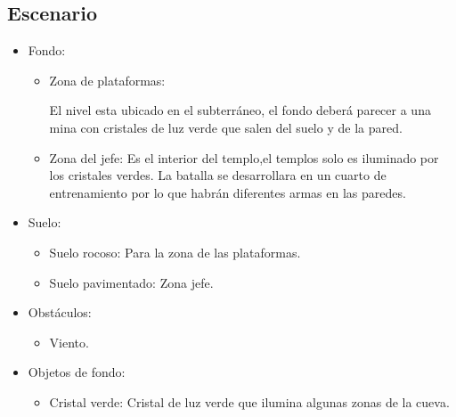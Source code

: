 \begin{itemize}
\subsection{Escenario}
\begin{itemize} 
        \item Fondo:
                \begin{itemize}
                        \item Zona de plataformas:
\\
\par
El nivel esta ubicado en el subterráneo, el fondo deberá parecer a una mina con cristales de luz verde que salen del suelo y de la pared.
                        \item Zona del jefe:
Es el interior del templo,el templos solo es iluminado por los cristales verdes. La batalla se desarrollara en un cuarto de entrenamiento por lo que habrán diferentes armas en las paredes.
                \end{itemize}
        \item Suelo:
                \begin{itemize}
                        \item Suelo rocoso: Para la zona de las plataformas.
                        \item Suelo pavimentado: Zona jefe.
                \end{itemize}
	  \item Obstáculos:
                \begin{itemize}
                        \item Viento.
                \end{itemize}
        \item Objetos de fondo:
                \begin{itemize}
                        \item Cristal verde: Cristal de luz verde que ilumina algunas zonas de la cueva.
                \end{itemize}
\end{itemize}   


\end{itemize}
